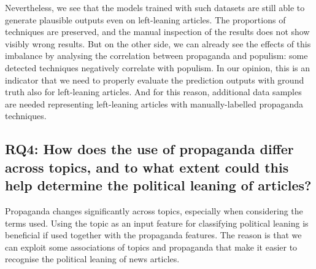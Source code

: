 \begin{enumerate}[label={\textbf{RQ3.\arabic*:}},leftmargin=2cm]
    Nevertheless, we see that the models trained with such datasets are still able to generate plausible outputs even on left-leaning articles. The proportions of techniques are preserved, and the manual inspection of the results does not show visibly wrong results.
    But on the other side, we can already see the effects of this imbalance by analysing the correlation between propaganda and populism: some detected techniques negatively correlate with populism. 
    In our opinion, this is an indicator that we need to properly evaluate the prediction outputs with ground truth also for left-leaning articles. And for this reason, additional data samples are needed representing left-leaning articles with manually-labelled propaganda techniques.
\end{enumerate}


\subsection*{RQ4: How does the use of propaganda differ across topics, and to what extent could this help determine the political leaning of articles?}


Propaganda changes significantly across topics, especially when considering the terms used. Using the topic as an input feature for classifying political leaning is beneficial if used together with the propaganda features. The reason is that we can exploit some associations of topics and propaganda that make it easier to recognise the political leaning of news articles.


